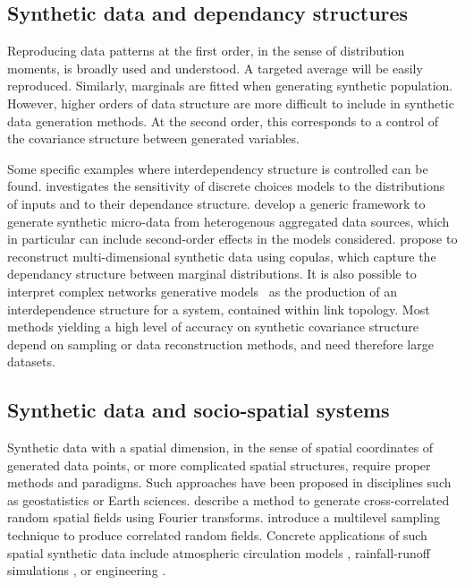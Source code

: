 \documentclass{bmcart}
\begin{document}
\subsection*{Synthetic data and dependancy structures}

Reproducing data patterns at the first order, in the sense of distribution moments, is broadly used and understood. A targeted average will be easily reproduced. Similarly, marginals are fitted when generating synthetic population. However, higher orders of data structure are more difficult to include in synthetic data generation methods. At the second order, this corresponds to a control of the covariance structure between generated variables.

Some specific examples where interdependency structure is controlled can be found. \cite{ye2011investigation} investigates the sensitivity of discrete choices models to the distributions of inputs and to their dependance structure. \cite{birkin1988synthesis} develop a generic framework to generate synthetic micro-data from heterogenous aggregated data sources, which in particular can include second-order effects in the models considered. \cite{li2014differentially} propose to reconstruct multi-dimensional synthetic data using copulas, which capture the dependancy structure between marginal distributions. It is also possible to interpret complex networks generative models~\cite{newman2003structure} as the production of an interdependence structure for a system, contained within link topology. Most methods yielding a high level of accuracy on synthetic covariance structure depend on sampling or data reconstruction methods, and need therefore large datasets.

\subsection*{Synthetic data and socio-spatial systems}

Synthetic data with a spatial dimension, in the sense of spatial coordinates of generated data points, or more complicated spatial structures, require proper methods and paradigms. Such approaches have been proposed in disciplines such as geostatistics or Earth sciences. \cite{robin1993cross} describe a method to generate cross-correlated random spatial fields using Fourier transforms. \cite{osborn2017multilevel} introduce a multilevel sampling technique to produce correlated random fields. Concrete applications of such spatial synthetic data include atmospheric circulation models \cite{gourdji2010regional}, rainfall-runoff simulations \cite{robin1993cross}, or engineering \cite{zhao2018simulation}.
\end{document}
